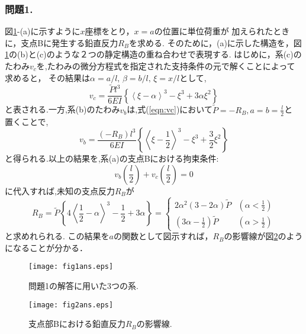 ﻿\documentclass[10pt,a4j]{jarticle}
\begin{document}
\subsubsection*{問題1.}
図\ref{fig:fig1}-(a)に示すように$x$座標をとり，$x=a$の位置に単位荷重が
加えられたときに，支点Bに発生する鉛直反力$R_B$を求める.
そのために，(a)に示した構造を，図\ref{fig:fig1}の(b)と(c)のような２つの静定構造の重ね合わせで表現する.
はじめに，系(c)のたわみ$v_c$を,たわみの微分方程式を指定された支持条件の元で解くことによって求めると，
その結果は$\alpha=a/l,\, \beta=b/l, \, \xi=x/l$として,
\begin{equation}
 v_c=\frac{\tilde Pl^3}{6EI}\left\{
 \left< \xi-\alpha \right>^3 -\xi^3 +3\alpha \xi^2 
 \right\}
 \label{eqn:vc}
\end{equation}
と表される.一方,系(b)のたわみ$v_b$は,式(\ref{eqn:vc})において$\tilde P=-R_B, a=b=\frac{l}{2}$と
置くことで,
\begin{equation}
 v_b=\frac{(-R_B)l^3}{6EI}\left\{
		\left< \xi-\frac{1}{2} \right>^3 -\xi^3 +\frac{3}{2}\xi^2
	\right\}
	\label{eqn:vb}
\end{equation}
と得られる.以上の結果を,系(a)の支点Bにおける拘束条件:
\begin{equation}
	v_b\left(\frac{l}{2}\right) 
	+
	v_c\left(\frac{l}{2}\right) =0
\end{equation}
に代入すれば,未知の支点反力$R_B$が
\begin{equation}
	R_B=
	\tilde P
	\left\{
		4\left< \frac{1}{2}-\alpha \right>^3-\frac{1}{2}+3\alpha
	\right\}
	=\left\{
	\begin{array}{cc}
		2\alpha^2(3-2\alpha)\tilde P & \left(\alpha < \frac{1}{2}\right) \\
		\left(3\alpha-\frac{1}{2}\right)\tilde P & \left(\alpha > \frac{1}{2}\right)
	\end{array}
	\right.
	\label{eqn:RB}
\end{equation}
と求めれられる.
この結果を$a$の関数として図示すれば，$R_B$の影響線が図\ref{fig:fig2}のようになることが分かる．
\begin{figure}[h]
	\begin{center}
	\texttt{[image: fig1ans.eps]}
	\end{center}
	\caption{問題1の解答に用いた3つの系.}
	\label{fig:fig1}
\end{figure}
\begin{figure}[h]
	\begin{center}
	\texttt{[image: fig2ans.eps]} 
	\end{center}
	\caption{支点部Bにおける鉛直反力$R_B$の影響線.}
	\label{fig:fig2}
\end{figure}
%
%
\end{document}
